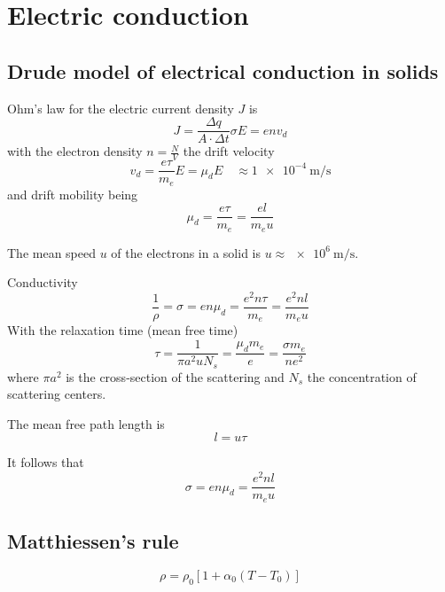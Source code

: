 \section{Electric conduction}

\subsection{Drude model of electrical conduction in solids}

Ohm's law for the electric current density $J$ is
\begin{equation}
    J = \frac{\Delta q}{A \cdot \Delta t}\sigma E = e n v_d
\end{equation}
with the electron density $n = \frac{N}{V}$ the drift velocity
\begin{equation}
    v_d = \frac{e \tau}{m_e} E = \mu_d E \quad \approx \SI{1e-4}{\meter\per\second}
\end{equation}
and drift mobility being
\begin{equation}
    \mu_d = \frac{e \tau}{m_e} = \frac{e l}{m_e u}
\end{equation}

The mean speed $u$ of the electrons in a solid is $u\approx\SI{e6}{\meter\per\second}$.

Conductivity
\begin{equation}
    \frac{1}{\rho} = \sigma = e n \mu_d = \frac{e^2 n \tau}{m_e} = \frac{e^2 n l}{m_e u}
\end{equation}
With the relaxation time (mean free time)
\begin{equation}
    \tau = \frac{1}{\pi a^2 u N_s} = \frac{\mu_d m_e}{e} = \frac{\sigma m_e}{n e^2}
\end{equation}
where $\pi a^2$ is the cross-section of the scattering and $N_s$ the concentration of scattering centers.

The mean free path length is
\begin{equation}
    l = u \tau
\end{equation}

It follows that
\begin{equation}
    \sigma = e n \mu_d = \frac{e^2 n l}{m_e u}
\end{equation}

\subsection{Matthiessen's rule}
\begin{equation}
    \rho = \rho_0 \left[ 1 + \alpha_0 \left( T - T_0 \right) \right]
\end{equation}

